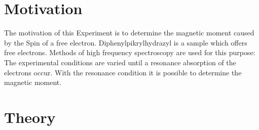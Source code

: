 \section{Motivation}
The motivation of this Experiment is to determine the magnetic moment caused by the Spin of a free electron.
Diphenylpikrylhydrazyl is a sample which offers free electrons. Methods of high frequency spectroscopy are used for this purpose:
The experimental conditions are varied until a resonance absorption of the electrons occur. With the resonance condition it is possible
to determine the magnetic moment. 
\section{Theory}
